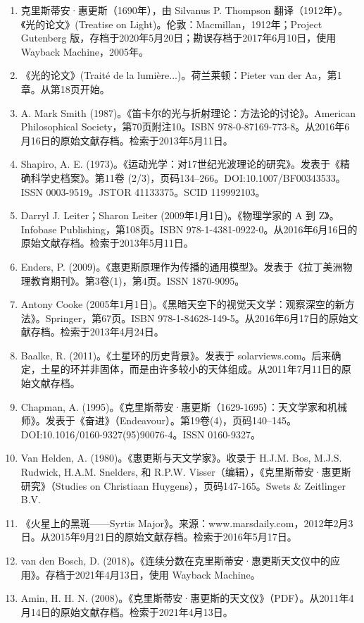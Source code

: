 \begin{enumerate}
\item 克里斯蒂安·惠更斯（1690年），由 Silvanus P. Thompson 翻译（1912年）。《光的论文》(Treatise on Light)。伦敦：Macmillan，1912年；Project Gutenberg 版，存档于2020年5月20日；勘误存档于2017年6月10日，使用 Wayback Machine，2005年。
\item 《光的论文》(Traité de la lumière...)。荷兰莱顿：Pieter van der Aa，第1章。从第18页开始。
\item A. Mark Smith (1987)。《笛卡尔的光与折射理论：方法论的讨论》。American Philosophical Society，第70页附注10。ISBN 978-0-87169-773-8。从2016年6月16日的原始文献存档。检索于2013年5月11日。
\item Shapiro, A. E. (1973)。《运动光学：对17世纪光波理论的研究》。发表于《精确科学史档案》。第11卷 (2/3)，页码134–266。DOI:10.1007/BF00343533。ISSN 0003-9519。JSTOR 41133375。SCID 119992103。
\item Darryl J. Leiter；Sharon Leiter (2009年1月1日)。《物理学家的 A 到 Z》。Infobase Publishing，第108页。ISBN 978-1-4381-0922-0。从2016年6月16日的原始文献存档。检索于2013年5月11日。
\item Enders, P. (2009)。《惠更斯原理作为传播的通用模型》。发表于《拉丁美洲物理教育期刊》。第3卷(1)，第4页。ISSN 1870-9095。
\item Antony Cooke (2005年1月1日)。《黑暗天空下的视觉天文学：观察深空的新方法》。Springer，第67页。ISBN 978-1-84628-149-5。从2016年6月17日的原始文献存档。检索于2013年4月24日。
\item Baalke, R. (2011)。《土星环的历史背景》。发表于 solarviews.com。后来确定，土星的环并非固体，而是由许多较小的天体组成。从2011年7月11日的原始文献存档。
\item Chapman, A. (1995)。《克里斯蒂安·惠更斯（1629-1695）：天文学家和机械师》。发表于《奋进》（Endeavour）。第19卷(4)，页码140–145。DOI:10.1016/0160-9327(95)90076-4。ISSN 0160-9327。
\item Van Helden, A. (1980)。《惠更斯与天文学家》。收录于 H.J.M. Bos, M.J.S. Rudwick, H.A.M. Snelders, 和 R.P.W. Visser（编辑），《克里斯蒂安·惠更斯研究》（Studies on Christiaan Huygens），页码147-165。Swets & Zeitlinger B.V.
\item 《火星上的黑斑——Syrtis Major》。来源：www.marsdaily.com，2012年2月3日。从2015年9月21日的原始文献存档。检索于2016年5月17日。
\item van den Bosch, D. (2018)。《连续分数在克里斯蒂安·惠更斯天文仪中的应用》。存档于2021年4月13日，使用 Wayback Machine。
\item Amin, H. H. N. (2008)。《克里斯蒂安·惠更斯的天文仪》（PDF）。从2011年4月14日的原始文献存档。检索于2021年4月13日。

\end{enumerate}
